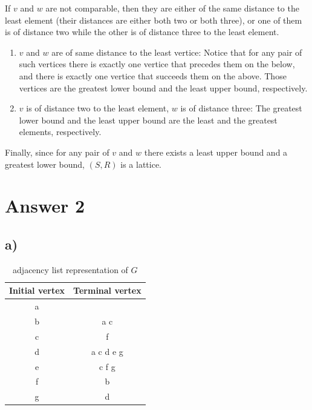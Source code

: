 \documentclass[11pt]{article}
\begin{document}
If $v$ and $w$ are not comparable, then they are either of the same distance to the least element (their distances are either both two or both three), or one of them is of distance two while the other is of distance three to the least element.

\begin{enumerate}
    \item $v$ and $w$ are of same distance to the least vertice: Notice that for any pair of such vertices there is exactly one vertice that precedes them on the below, and there is exactly one vertice that succeeds them on the above. Those vertices are the greatest lower bound and the least upper bound, respectively.
    \item $v$ is of distance two to the least element, $w$ is of distance three: The greatest lower bound and the least upper bound are the least and the greatest elements, respectively.
\end{enumerate}

Finally, since for any pair of $v$ and $w$ there exists a least upper bound and a greatest lower bound, $(S,R)$ is a lattice.


\section*{Answer 2}
\subsection*{a)}

\begin{table}[H]
    \centering
    \begin{tabular}{c c}
        Initial vertex & Terminal vertex\\
        \hline
        a & \\
        b & a c\\
        c & f\\
        d & a c d e g\\
        e & c f g\\
        f & b\\
        g & d\\
    \end{tabular}
    \caption{adjacency list representation of $G$}
\end{table}
\end{document}
